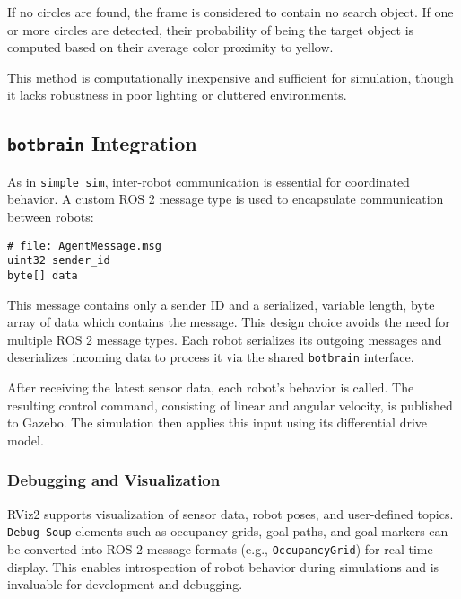 If no circles are found, the frame is considered to contain no search object. If one or more circles are detected, their probability of being the target object is computed based on their average color proximity to yellow.

This method is computationally inexpensive and sufficient for simulation, though it lacks robustness in poor lighting or cluttered environments.

\subsection{\texttt{botbrain} Integration}
\label{sub:Botbrain_integration}
As in \texttt{simple\_sim}, inter-robot communication is essential for coordinated behavior. A custom ROS 2 message type is used to encapsulate communication between robots:

\begin{verbatim}
# file: AgentMessage.msg
uint32 sender_id
byte[] data
\end{verbatim}

This message contains only a sender ID and a serialized, variable length, byte array of data which contains the message. This design choice avoids the need for multiple ROS 2 message types. Each robot serializes its outgoing messages and deserializes incoming data to process it via the shared \texttt{botbrain} interface.

After receiving the latest sensor data, each robot's behavior is called. The resulting control command, consisting of linear and angular velocity, is published to Gazebo. The simulation then applies this input using its differential drive model.

\subsubsection{Debugging and Visualization}
\label{sec:debugging_rviz}


RViz2 supports visualization of sensor data, robot poses, and user-defined topics. \texttt{Debug Soup} elements such as occupancy grids, goal paths, and goal markers can be converted into ROS 2 message formats (e.g., \texttt{OccupancyGrid}) for real-time display. This enables introspection of robot behavior during simulations and is invaluable for development and debugging.

